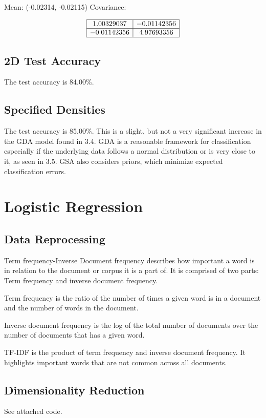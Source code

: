 \documentclass{article}
\begin{document}
Mean: (-0.02314, -0.02115) 
Covariance:

\[
\begin{array}{|c|c|}
\hline
 1.00329037 & -0.01142356 \\
\hline
 -0.01142356 & 4.97693356 \\
\hline
\end{array}
\]

\subsection{2D Test Accuracy}
The test accuracy is 84.00\%.

\subsection{Specified Densities}
The test accuracy is 85.00\%. This is a slight, but not a very significant increase in the GDA model found in 3.4. GDA is a reasonable framework for classification especially if the underlying data follows a normal distribution or is very close to it, as seen in 3.5. GSA also considers priors, which minimize expected classification errors.

\section{Logistic Regression}
\subsection{Data Reprocessing}
Term frequency-Inverse Document frequency describes how important a word is in relation to the document or corpus it is a part of. It is comprised of two parts: Term frequency and inverse document frequency.

Term frequency is the ratio of the number of times a given word is in a document and the number of words in the document.

Inverse document frequency is the log of the total number of documents over the number of documents that has a given word.

TF-IDF is the product of term frequency and inverse document frequency. It highlights important words that are not common across all documents.

\subsection{Dimensionality Reduction}
See attached code.
\end{document}
